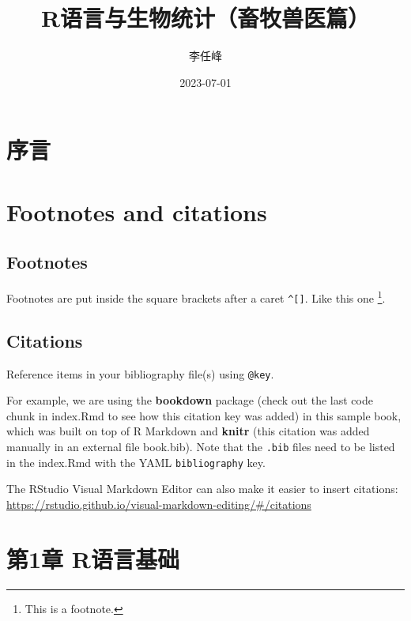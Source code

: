 \documentclass[
]{book}
\title{R语言与生物统计（畜牧兽医篇）}
\author{李任峰}
\date{2023-07-01}
\theoremstyle{definition}
\theoremstyle{definition}
\theoremstyle{definition}
\theoremstyle{definition}
\theoremstyle{remark}
\begin{document}
\maketitle

{
\setcounter{tocdepth}{1}
\tableofcontents
}
\hypertarget{ux5e8fux8a00}{%
\chapter*{序言}\label{ux5e8fux8a00}}

\hypertarget{footnotes-and-citations}{%
\chapter{Footnotes and citations}\label{footnotes-and-citations}}

\hypertarget{footnotes}{%
\section{Footnotes}\label{footnotes}}

Footnotes are put inside the square brackets after a caret \texttt{\^{}{[}{]}}. Like this one \footnote{This is a footnote.}.

\hypertarget{citations}{%
\section{Citations}\label{citations}}

Reference items in your bibliography file(s) using \texttt{@key}.

For example, we are using the \textbf{bookdown} package \citep{R-bookdown} (check out the last code chunk in index.Rmd to see how this citation key was added) in this sample book, which was built on top of R Markdown and \textbf{knitr} \citep{xie2015} (this citation was added manually in an external file book.bib).
Note that the \texttt{.bib} files need to be listed in the index.Rmd with the YAML \texttt{bibliography} key.

The RStudio Visual Markdown Editor can also make it easier to insert citations: \url{https://rstudio.github.io/visual-markdown-editing/\#/citations}

\hypertarget{ux7b2c1ux7ae0-rux8bedux8a00ux57faux7840}{%
\chapter*{第1章 R语言基础}\label{ux7b2c1ux7ae0-rux8bedux8a00ux57faux7840}}
\end{document}
